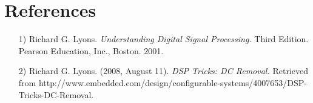 \documentclass{article}
\begin{document}
\newpage
\section*{References}
\begin{flushleft}
	\begin{itemize}
		\item[1)] Richard G. Lyons. \textit{Understanding Digital Signal Processing.} Third Edition. Pearson Education, Inc., Boston. 2001.
		\item[2)] Richard G. Lyons. (2008, August 11). \textit{DSP Tricks: DC Removal.} Retrieved from http://www.embedded.com/design/configurable-systems/4007653/DSP-Tricks-DC-Removal.
	\end{itemize}
\end{flushleft}
\end{document}
